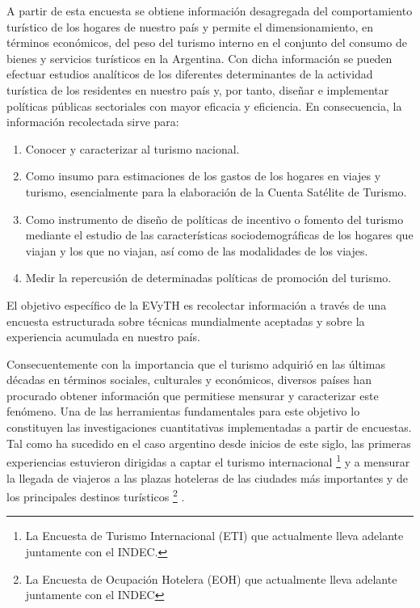 \documentclass[
  openany]{book}
\begin{document}
A partir de esta encuesta se obtiene información desagregada del comportamiento turístico de los hogares de nuestro país y permite el dimensionamiento, en términos económicos, del peso del turismo interno en el conjunto del consumo de bienes y servicios turísticos en la Argentina. Con dicha información se pueden efectuar estudios analíticos de los diferentes determinantes de la actividad turística de los residentes en nuestro país y, por tanto, diseñar e implementar políticas públicas sectoriales con mayor eficacia y eficiencia. En consecuencia, la información recolectada sirve para:

\begin{enumerate}
\def\labelenumi{\arabic{enumi}.}
\item
  Conocer y caracterizar al turismo nacional.
\item
  Como insumo para estimaciones de los gastos de los hogares en viajes y turismo, esencialmente para la elaboración de la Cuenta Satélite de Turismo.
\item
  Como instrumento de diseño de políticas de incentivo o fomento del turismo mediante el estudio de las características sociodemográficas de los hogares que viajan y los que no viajan, así como de las modalidades de los viajes.
\item
  Medir la repercusión de determinadas políticas de promoción del turismo.
\end{enumerate}

El objetivo específico de la EVyTH es recolectar información a través de una encuesta estructurada sobre técnicas mundialmente aceptadas y sobre la experiencia acumulada en nuestro país.

Consecuentemente con la importancia que el turismo adquirió en las últimas décadas en términos sociales, culturales y económicos, diversos países han procurado obtener información que permitiese mensurar y caracterizar este fenómeno. Una de las herramientas fundamentales para este objetivo lo constituyen las investigaciones cuantitativas implementadas a partir de encuestas. Tal como ha sucedido en el caso argentino desde inicios de este siglo, las primeras experiencias estuvieron dirigidas a captar el turismo internacional \footnote{La Encuesta de Turismo Internacional (ETI) que actualmente lleva adelante juntamente con el INDEC.} y a mensurar la llegada de viajeros a las plazas hoteleras de las ciudades más importantes y de los principales destinos turísticos \footnote{La Encuesta de Ocupación Hotelera (EOH) que actualmente lleva adelante juntamente con el INDEC} .
\end{document}
